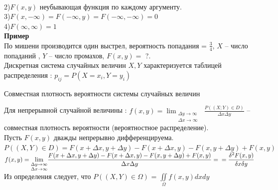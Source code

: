 \documentclass[russian, 12pt, fleqn]{article}
\begin{document}
\\
2)$F(x, y)$ неубывающая функция по каждому аргументу.\\
3)$F(x, -\infty) = F(-\infty, y) = F(-\infty, -\infty) = 0$\\
4)$F(\infty, \infty) = 1$\\
\textbf{Пример}\\
По мишени производится один выстрел, вероятность попадания = $\frac{3}{4}$, $X$ --  число попаданий , $Y$ -- число промахов, $F(x, y)=$ ?.\\
Дискретная система случайных величин $X,Y$ характеризуется таблицей распределения : $p_{ij} = P(X=x_i, Y = y_i)$\\
\begin{center}
$\textbf{Совместная плотность вероятности системы случайных величин}$
\end{center}
Для непрерывной случайной величины : $f(x, y) =  \displaystyle{  \lim_{\substack{{\Delta y\to{\infty}}\\
												        {\Delta x\to{\infty}}}}}$
$\frac{P((X;Y)\in D)}{\Delta x \Delta y}$ -- совместная плотность вероятности (вероятностное распределение).\\
Пусть $F(x, y)$ дважды непрерывно дифференцируема. \\
$P((X, Y) \in D) = F(x + \Delta x, y + \Delta y) -  F(x + \Delta x, y ) -  F(x , y + \Delta y) +  F(x , y )$ \\
$f(x, y)=  \displaystyle{  \lim_{\substack{{\Delta y\to{\infty}}\\ {\Delta x\to{\infty}}}}} \frac{ F(x + \Delta x, y + \Delta y) -  F(x + \Delta x, y ) -  F(x , y + \Delta y) +  F(x , y )}{\Delta x \Delta y} = \\ = \frac{\delta^2 F(x, y)}{\delta x \delta y}$\\
Из  определения следует, что $P((X, Y) \in \Omega)$  = $\displaystyle{\iint\limits_{\Omega}} f(x, y)dxdy$\\
\end{document}
